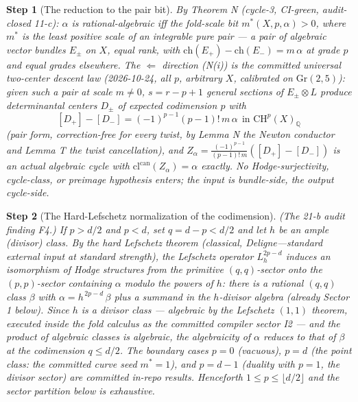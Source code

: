 \documentclass[11pt]{article}
\newtheorem{step}{Step}
\begin{document}
\begin{step}[The reduction to the pair bit]\label{step:reduction}
By Theorem N (cycle-3, CI-green, audit-closed 11-c): $\alpha$ is
rational-algebraic iff the fold-scale bit $m^*(X,p,\alpha) > 0$, where
$m^*$ is the least positive scale of an \emph{integrable pure pair} --- a
pair of \emph{algebraic} vector bundles $E_\pm$ on $X$, equal rank, with
$\mathrm{ch}(E_+) - \mathrm{ch}(E_-) = m\,\alpha$ at grade $p$ and equal
grades elsewhere. The $\Leftarrow$ direction (N(i)) is the committed
universal two-center descent law (2026-10-24, all $p$, arbitrary $X$,
calibrated on $\mathrm{Gr}(2,5)$): given such a pair at scale $m \ne 0$,
$s = r - p + 1$ general sections of $E_\pm \otimes L$ produce determinantal
centers $D_\pm$ of expected codimension $p$ with
\[
[D_+] - [D_-] = (-1)^{p-1} (p-1)!\, m\, \alpha \ \ \text{in } \mathrm{CH}^p(X)_\mathbb{Q}
\]
(pair form, correction-free for every twist, by Lemma N the Newton conductor
and Lemma T the twist cancellation), and
$Z_\alpha = \frac{(-1)^{p-1}}{(p-1)!\,m}([D_+] - [D_-])$ is an actual
algebraic cycle with $\mathrm{cl}^{\mathrm{can}}(Z_\alpha) = \alpha$ exactly.
No Hodge-surjectivity, cycle-class, or preimage hypothesis enters; the input
is bundle-side, the output cycle-side.
\end{step}

\begin{step}[The Hard-Lefschetz normalization of the codimension]
\label{step:HL}
(The 21-b audit finding F4.) If $p > d/2$ and $p < d$, set $q = d - p <
d/2$ and let $h$ be an ample (divisor) class. By the hard Lefschetz theorem
(classical, Deligne---standard external input at standard strength), the
Lefschetz operator $L_h^{2p-d}$ induces an isomorphism of Hodge structures
from the primitive $(q,q)$-sector onto the $(p,p)$-sector containing
$\alpha$ modulo the powers of $h$: there is a rational $(q,q)$ class
$\beta$ with $\alpha = h^{\,2p-d}\, \beta$ plus a summand in the
$h$-divisor algebra (already Sector 1 below). Since $h$ is a divisor class
--- algebraic by the Lefschetz $(1,1)$ theorem, executed inside the fold
calculus as the committed compiler sector I2 --- and the product of algebraic
classes is algebraic, the algebraicity of $\alpha$ reduces to that of
$\beta$ at the codimension $q \le d/2$. The boundary cases $p = 0$
(vacuous), $p = d$ (the point class: the committed curve seed $m^* = 1$),
and $p = d-1$ (duality with $p = 1$, the divisor sector) are committed
in-repo results. \emph{Henceforth $1 \le p \le \lfloor d/2 \rfloor$ and the
sector partition below is exhaustive.}
\end{step}
\end{document}
